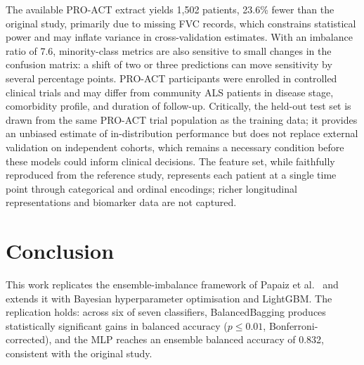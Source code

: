 \documentclass[a4paper,twoside]{article}
\begin{document}
The available PRO-ACT extract yields 1,502 patients, 23.6\% fewer than the
original study, primarily due to missing FVC records, which constrains
statistical power and may inflate variance in cross-validation estimates.
With an imbalance ratio of 7.6, minority-class metrics are also sensitive to
small changes in the confusion matrix: a shift of two or three predictions can
move sensitivity by several percentage points. PRO-ACT participants were enrolled in controlled clinical trials and may differ
from community ALS patients in disease stage, comorbidity profile, and duration
of follow-up. Critically, the held-out test set is drawn from the same PRO-ACT
trial population as the training data; it provides an unbiased estimate of
in-distribution performance but does not replace external validation on independent
cohorts, which remains a necessary condition before these models could inform
clinical decisions. The feature set, while faithfully
reproduced from the reference study, represents each patient at a single time
point through categorical and ordinal encodings; richer longitudinal
representations and biomarker data are not captured.


\section{Conclusion}
\label{sec:conclusion}

This work replicates the ensemble-imbalance framework of Papaiz
et al.~\cite{Papaiz2024} and extends it with Bayesian hyperparameter
optimisation and LightGBM. The replication holds: across six of seven
classifiers, BalancedBagging produces statistically significant gains in
balanced accuracy ($p \leq 0.01$, Bonferroni-corrected), and the MLP reaches an
ensemble balanced accuracy of 0.832, consistent with the original study.
\end{document}
